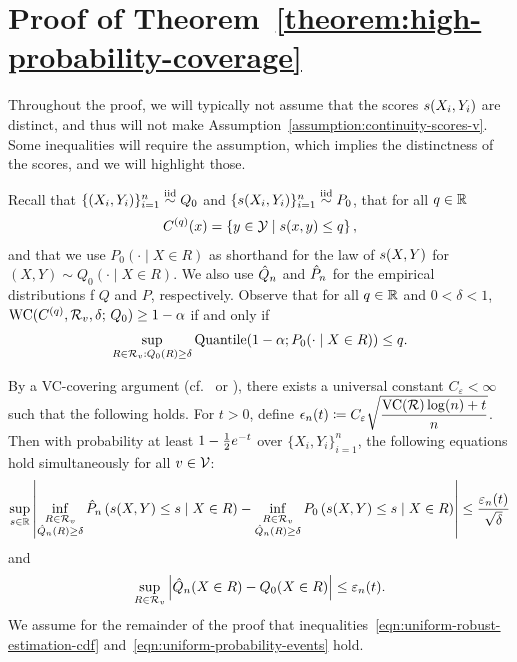 
\section{Proof of Theorem~\ref{theorem:high-probability-coverage}}
\label{sec:proof-high-probability-coverage}

Throughout the proof, we will typically not assume that the scores
$s(X_i, Y_i)$ are distinct, and thus will not make
Assumption~\ref{assumption:continuity-scores-v}. Some inequalities will
require the assumption, which implies the distinctness
of the scores, and we will highlight those.

Recall that $\{(X_i,Y_i)\}_{i=1}^n \stackrel{\rm iid}{\sim} Q_0$ and 
$\{s(X_i,Y_i)\}_{i=1}^n \stackrel{\rm iid}{\sim} P_0$, that for all $q \in \mathbb{R}$
\begin{align*}
  C^{(q)}(x) = \left\{ y \in \mathcal{Y} \mid s(x,y) \le q \right\},
\end{align*}
and that we use $P_0(\cdot \mid X \in R)$ as shorthand for the law
of $s(X, Y)$ for $(X, Y) \sim Q_0(\cdot \mid X \in R)$.
We also use $\hat{Q}_n$ and $\hat{P}_n$ for the empirical distributions f $Q$ and $P$,
respectively.
Observe that for all $q \in \mathbb{R}$ and $0<\delta < 1$, 
$\textup{WC}(C^{(q)}, \mathcal{R}_v, \delta; \, Q_0) \ge 1 - \alpha$ 
if and only if
\begin{align*}
  \sup_{R \in \mathcal{R}_v: Q_0(R) \ge \delta}
  \textup{Quantile}(1-\alpha;P_0(\cdot \mid X \in R)) \le q.
\end{align*}

By a VC-covering argument (cf.~\cite[Sec.~A.4]{CauchoisGuDu21} or
\cite[Thm.~5]{BarberCaRaTi19a}), there exists a universal constant
$C_\varepsilon < \infty$ such that the following holds.  For $t>0$, define
$\epsilon_n(t) \coloneqq C_\varepsilon \sqrt{\dfrac{\text{VC}(\mathcal{R})\log(n) +
    t}{n}}$. Then with probability at least $1-\frac{1}{2} e^{-t}$ over $\{X_i,Y_i
\}_{i =1}^n$, the following equations hold simultaneously for all $v \in
\mathcal{V}$:
\begin{align}
  \label{eqn:uniform-robust-estimation-cdf}
  \sup_{s \in \mathbb{R}} \left|
  \inf_{\substack{R \in \mathcal{R}_v \\ \hat{Q}_n (R) \ge \delta }}
  \hat{P}_n\left( s(X,Y) \le s \mid X \in R \right) -  
  \inf_{\substack{R \in \mathcal{R}_v \\ \hat{Q}_n(R) \ge \delta }}
  P_0\left( s(X,Y) \le s \mid X \in R \right) \right|
  \le \frac{\varepsilon_n(t)}{\sqrt{\delta}}
\end{align} 
and
\begin{align}
  \label{eqn:uniform-probability-events}
  \sup_{R \in \mathcal{R}_v} \left|  \hat{Q}_n( X \in R) - Q_0(X \in R) \right| \le  \varepsilon_n(t).
\end{align}
We assume for the remainder of the proof that
inequalities~\eqref{eqn:uniform-robust-estimation-cdf}
and~\eqref{eqn:uniform-probability-events} hold.

